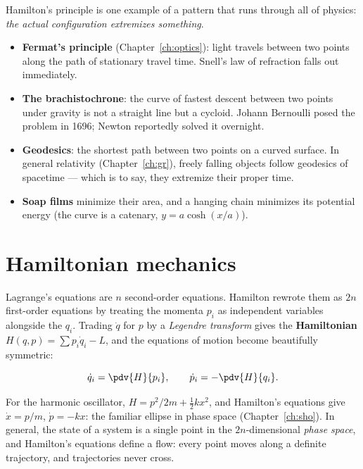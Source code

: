 Hamilton's principle is one example of a pattern that runs through all of physics: \emph{the actual configuration extremizes something}.
\begin{itemize}[itemsep=3pt]
  \item \textbf{Fermat's principle} (Chapter~\ref{ch:optics}): light travels between two points along the path of stationary travel time. Snell's law of refraction falls out immediately.
  \item \textbf{The brachistochrone}: the curve of fastest descent between two points under gravity is not a straight line but a cycloid. Johann Bernoulli posed the problem in 1696; Newton reportedly solved it overnight.
  \item \textbf{Geodesics}: the shortest path between two points on a curved surface. In general relativity (Chapter~\ref{ch:gr}), freely falling objects follow geodesics of spacetime --- which is to say, they extremize their proper time.
  \item \textbf{Soap films} minimize their area, and a hanging chain minimizes its potential energy (the curve is a catenary, $y = a\cosh(x/a)$).
\end{itemize}

\section{Hamiltonian mechanics}

Lagrange's equations are $n$ second-order equations. Hamilton rewrote them as $2n$ first-order equations by treating the momenta $p_i$ as independent variables alongside the $q_i$. Trading $\dot q$ for $p$ by a \emph{Legendre transform} gives the \textbf{Hamiltonian} $H(q,p) = \sum p_i\dot q_i - L$, and the equations of motion become beautifully symmetric:

\begin{law}
\[
  \dot q_i = \pdv{H}{p_i}, \qquad \dot p_i = -\pdv{H}{q_i}.
\]
\end{law}

For the harmonic oscillator, $H = p^2/2m + \tfrac12 kx^2$, and Hamilton's equations give $\dot x = p/m$, $\dot p = -kx$: the familiar ellipse in phase space (Chapter~\ref{ch:sho}). In general, the state of a system is a single point in the $2n$-dimensional \emph{phase space}, and Hamilton's equations define a flow: every point moves along a definite trajectory, and trajectories never cross.

